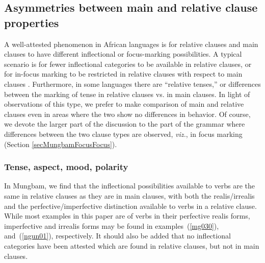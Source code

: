 \documentclass[10pt,twoside]{article}
\newcommand{\sref}[1]{Section \ref{#1}}
\begin{document}
%
\subsection{Asymmetries between main and relative clause properties}\label{secMungbamFocus}
%

A well-attested phenomenon in African languages is for relative clauses and main clauses
to have different inflectional or focus-marking possibilities. 
A typical scenario
is for fewer inflectional categories to be available in relative clauses, or for
in-focus marking to be restricted in relative clauses with respect to
main clauses \citep{hyman:1984}. Furthermore, in some languages there are
``relative tenses,'' or differences between the marking of tense in relative
clauses vs. in main clauses. 
In light of observations
of this type, we prefer to make comparison of main and relative
clauses even in areas where the two show no differences in behavior.
Of course, we devote the larger part of the discussion to the
part of the grammar where differences between the two clause
types are observed, {\it viz.}, in focus marking (\sref{secMungbamFocusFocus}).

\subsubsection{Tense, aspect, mood, polarity}
In Mungbam, we find that the inflectional possibilities available
to verbs are the same in relative clauses as they are in main
clauses, with both the realis/irrealis and the perfective/imperfective
distinction available to verbs in a relative clause. 
While most examples in this paper are of verbs in their perfective realis
forms, imperfective and irrealis forms may be found
in examples~(\ref{mg030}), and~(\ref{ngun01}), respectively.
It should also be added that no inflectional categories have
been attested which are found in relative clauses, but not
in main clauses.
\end{document}
